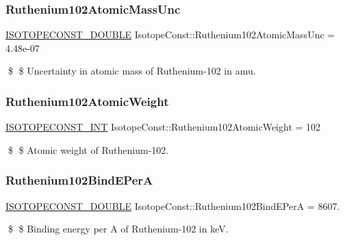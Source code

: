 \subsubsection{\texorpdfstring{Ruthenium102\+Atomic\+Mass\+Unc}{Ruthenium102AtomicMassUnc}}
{\footnotesize\ttfamily \mbox{\hyperlink{group___isotope_const-_macros_ga8f45a7272ce02c0b4c65c44636ed719a}{I\+S\+O\+T\+O\+P\+E\+C\+O\+N\+S\+T\+\_\+\+D\+O\+U\+B\+LE}} Isotope\+Const\+::\+Ruthenium102\+Atomic\+Mass\+Unc = 4.\+48e-\/07}

\$ \$ Uncertainty in atomic mass of Ruthenium-\/102 in amu. \mbox{\label{group___isotope_const-_ruthenium-_ru102_ga9350bc1fc9c56c86e62334fa33ea23fa}} 
\subsubsection{\texorpdfstring{Ruthenium102\+Atomic\+Weight}{Ruthenium102AtomicWeight}}
{\footnotesize\ttfamily \mbox{\hyperlink{group___isotope_const-_macros_ga5f18360b3e99483a35c32d789e62621c}{I\+S\+O\+T\+O\+P\+E\+C\+O\+N\+S\+T\+\_\+\+I\+NT}} Isotope\+Const\+::\+Ruthenium102\+Atomic\+Weight = 102}

\$ \$ Atomic weight of Ruthenium-\/102. \mbox{\label{group___isotope_const-_ruthenium-_ru102_ga04d15dc003b669af60e617a7482f28eb}} 
\subsubsection{\texorpdfstring{Ruthenium102\+Bind\+E\+PerA}{Ruthenium102BindEPerA}}
{\footnotesize\ttfamily \mbox{\hyperlink{group___isotope_const-_macros_ga8f45a7272ce02c0b4c65c44636ed719a}{I\+S\+O\+T\+O\+P\+E\+C\+O\+N\+S\+T\+\_\+\+D\+O\+U\+B\+LE}} Isotope\+Const\+::\+Ruthenium102\+Bind\+E\+PerA = 8607.}

\$ \$ Binding energy per A of Ruthenium-\/102 in keV. \mbox{\label{group___isotope_const-_ruthenium-_ru102_ga473ac4585420dfdffdff6a26adbc80d2}} 
